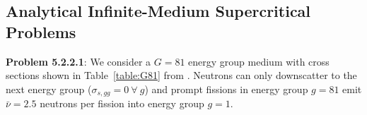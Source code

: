 
\subsection{Analytical Infinite-Medium Supercritical Problems}


\textbf{Problem 5.2.2.1}: We consider a $G = 81$ energy group medium with cross sections shown in Table~\ref{table:G81} from \cite{Betzler2014Alpha}. Neutrons can only downscatter to the next energy group ($\sigma_{s,gg} = 0 \: \forall  \: g$) and prompt fissions in energy group $g = 81$ emit $\bar{\nu} = 2.5$ neutrons per fission into energy group $g = 1$.


